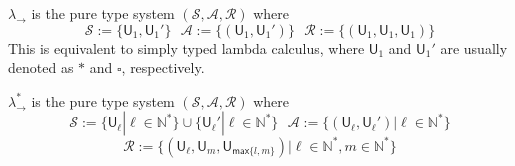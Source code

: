   \begin{definition} $\lambda_\to$ is the pure type system $(\mathcal{S}, \mathcal{A}, \mathcal{R})$ where
    $$\mathcal{S} := \{\mathsf{U}_1, \mathsf{U}_1'\} \ \ \ \mathcal{A} := \{(\mathsf{U}_1, \mathsf{U}_1')\} \ \ \ 
      \mathcal{R} := \{(\mathsf{U}_1, \mathsf{U}_1, \mathsf{U}_1)\}$$
    This is equivalent to simply typed lambda calculus, where $\mathsf{U}_1$ and $\mathsf{U}_1'$ are
    usually denoted as $*$ and $\square$, respectively.
  \end{definition}

  \begin{definition} $\lambda_\to^*$ is the pure type system $(\mathcal{S}, \mathcal{A}, \mathcal{R})$ where
    $$\mathcal{S} := \{\mathsf{U}_\ell | \ell \in \mathbb{N}^*\} \cup \{\mathsf{U}_\ell' | \ell \in \mathbb{N}^*\} \ \ \
      \mathcal{A} := \{(\mathsf{U}_\ell, \mathsf{U}_\ell') | \ell \in \mathbb{N}^*\}$$
    $$\mathcal{R} := \{(\mathsf{U}_\ell, \mathsf{U}_m, \mathsf{U}_{\mathsf{max} \{l, m\}}) | \ell \in \mathbb{N}^*, m \in \mathbb{N}^*\}$$
  \end{definition}
